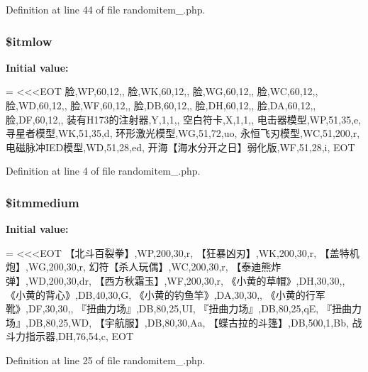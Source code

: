 Definition at line 44 of file randomitem\+\_.\+php.

\hypertarget{randomitem__1_8php_ae9da24b832a28bf9820e7362042062d2}{
\subsubsection[{\$itmlow}]{\setlength{\rightskip}{0pt plus 5cm}\$itmlow}}\label{randomitem__1_8php_ae9da24b832a28bf9820e7362042062d2}
{\bfseries Initial value\+:}
\begin{DoxyCode}
= <<<EOT
脸,WP,60,12,,
脸,WK,60,12,,
脸,WG,60,12,,
脸,WC,60,12,,
脸,WD,60,12,,
脸,WF,60,12,,
脸,DB,60,12,,
脸,DH,60,12,,
脸,DA,60,12,,
脸,DF,60,12,,
装有H173的注射器,Y,1,1,,
空白符卡,X,1,1,,
电击器模型,WP,51,35,e,
寻星者模型,WK,51,35,d,
环形激光模型,WG,51,72,uo,
永恒飞刃模型,WC,51,200,r,
电磁脉冲IED模型,WD,51,28,ed,
开海【海水分开之日】弱化版,WF,51,28,i,
EOT
\end{DoxyCode}


Definition at line 4 of file randomitem\+\_.\+php.

\hypertarget{randomitem__1_8php_a58ffa9cdc49afbc651d4d869a464f5f5}{
\subsubsection[{\$itmmedium}]{\setlength{\rightskip}{0pt plus 5cm}\$itmmedium}}\label{randomitem__1_8php_a58ffa9cdc49afbc651d4d869a464f5f5}
{\bfseries Initial value\+:}
\begin{DoxyCode}
= <<<EOT
【北斗百裂拳】,WP,200,30,r,
【狂暴凶刃】,WK,200,30,r,
【盖特机炮】,WG,200,30,r,
幻符【杀人玩偶】,WC,200,30,r,
【泰迪熊炸弹】,WD,200,30,dr,
【西方秋霜玉】,WF,200,30,r,
《小黄的草帽》,DH,30,30,,
《小黄的背心》,DB,40,30,G,
《小黄的钓鱼竿》,DA,30,30,,
《小黄的行军靴》,DF,30,30,,
『扭曲力场』,DB,80,25,UI,
『扭曲力场』,DB,80,25,qE,
『扭曲力场』,DB,80,25,WD,
【宇航服】,DB,80,30,Aa,
【蝶古拉的斗篷】,DB,500,1,Bb,
战斗力指示器,DH,76,54,c,
EOT
\end{DoxyCode}


Definition at line 25 of file randomitem\+\_.\+php.

